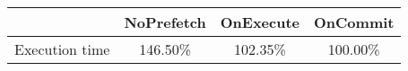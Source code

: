 \begin{tabular}{ l|ccc }
 & NoPrefetch & OnExecute & OnCommit\\ \hline
Execution time & 146.50\% & 102.35\% & 100.00\%\\ \hline
\end{tabular}

